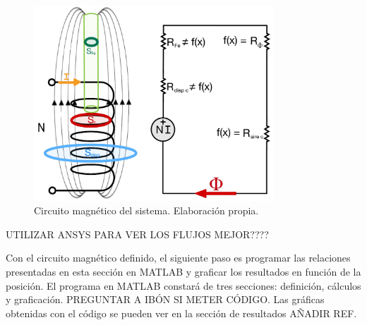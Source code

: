 \begin{figure}[H]
    \centering
    \includegraphics[width=9cm]{FigurasMemoria/circuitoMag.jpg}
    \caption{Circuito magnético del sistema. Elaboración propia.}
    \label{fig:circuitoMag} %
\end{figure}

UTILIZAR ANSYS PARA VER LOS FLUJOS MEJOR????

Con el circuito magnético definido, el siguiente paso es programar las relaciones presentadas en esta sección en MATLAB y graficar los resultados en función de la posición. El programa en MATLAB constará de tres secciones: definición, cálculos y graficación. PREGUNTAR A IBÓN SI METER CÓDIGO. Las gráficas obtenidas con el código se pueden ver en la sección de resultados AÑADIR REF.